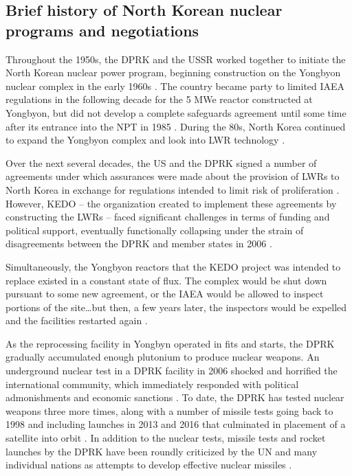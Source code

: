 \documentclass{article}
\begin{document}
\subsection{Brief history of North Korean nuclear programs and negotiations}

Throughout the 1950s, the DPRK and the USSR worked together to initiate the North Korean nuclear power program, beginning construction on the Yongbyon nuclear complex in the early 1960s \cite{nti15}. The country became party to limited IAEA regulations in the following decade for the 5 MWe reactor constructed at Yongbyon, but did not develop a complete safeguards agreement until some time after its entrance into the NPT in 1985 \cite{iaea09}. During the 80s, North Korea continued to expand the Yongbyon complex and look into LWR technology \cite{ntiYongbyon}.

Over the next several decades, the US and the DPRK signed a number of agreements under which assurances were made about the provision of LWRs to North Korea in exchange for regulations intended to limit risk of proliferation \cite{agreed, davenport}. However, KEDO – the organization created to implement these agreements by constructing the LWRs – faced significant challenges in terms of funding and political support, eventually functionally collapsing under the strain of disagreements between the DPRK and member states in 2006 \cite{kedohist}.

Simultaneously, the Yongbyon reactors that the KEDO project was intended to replace existed in a constant state of flux. The complex would be shut down pursuant to some new agreement, or the IAEA would be allowed to inspect portions of the site…but then, a few years later, the inspectors would be expelled and the facilities restarted again \cite{davenport,nti15,iaea09}.

As the reprocessing facility in Yongbyn operated in fits and starts, the DPRK gradually accumulated enough plutonium to produce nuclear weapons. An underground nuclear test in a DPRK facility in 2006 shocked and horrified the international community, which immediately responded with political admonishments and economic sanctions \cite{davenport}. To date, the DPRK has tested nuclear weapons three more times, along with a number of missile tests going back to 1998 \cite{orfall} and including launches in 2013 and 2016 that culminated in placement of a satellite into orbit \cite{davenport}. In addition to the nuclear tests, missile tests and rocket launches by the DPRK have been roundly criticized by the UN and many individual nations as attempts to develop effective nuclear missiles \cite{unApr12}.
\end{document}

